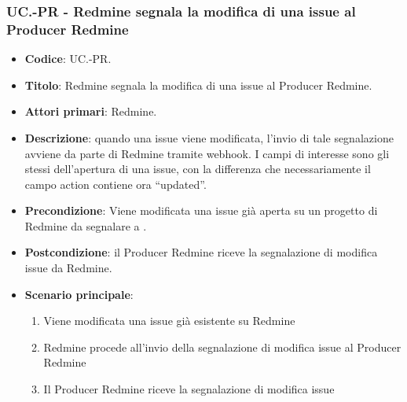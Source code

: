 \subsubsection{UC\theuccount.\thesubuccount-PR - Redmine segnala la modifica di una issue al Producer Redmine}
\begin{itemize}
	\item \textbf{Codice}: UC\theuccount.\thesubuccount-PR.
	\item \textbf{Titolo}: Redmine segnala la modifica di una issue al Producer Redmine.
	\item \textbf{Attori primari}: Redmine.
	\item \textbf{Descrizione}: quando una issue viene modificata, l'invio di tale segnalazione
	avviene da parte di Redmine tramite webhook.
	I campi di interesse sono gli stessi dell'apertura di una issue, con la differenza che necessariamente il campo action contiene ora ``updated''.
	\item \textbf{Precondizione}: Viene modificata una issue già aperta su un
	progetto di Redmine da segnalare a \progetto.
	\item \textbf{Postcondizione}: il Producer Redmine riceve la segnalazione di modifica issue da Redmine.
	\item \textbf{Scenario principale}:
	\begin{enumerate}
		\item Viene modificata una issue già esistente su Redmine
		\item Redmine procede all'invio della segnalazione di modifica issue al Producer Redmine
        \item Il Producer Redmine riceve la segnalazione di modifica issue
	\end{enumerate}

\end{itemize}


